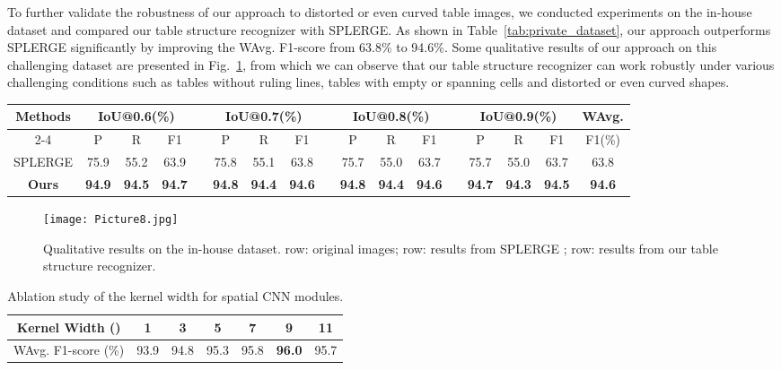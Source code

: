\documentclass[final,3p,times,twocolumn]{elsarticle}
\begin{document}
To further validate the robustness of our approach to distorted or even curved table images, we conducted experiments on the in-house dataset and compared our table structure recognizer with SPLERGE. As shown in Table~\ref{tab:private_dataset}, our approach outperforms SPLERGE significantly by improving the WAvg. F1-score from 63.8\% to 94.6\%. Some qualitative results of our approach on this challenging dataset are presented in Fig.~\ref{fig:TSR_curved_demo}, from which we can observe that our table structure recognizer can work robustly under various challenging conditions such as tables without ruling lines, tables with empty or spanning cells and distorted or even curved shapes. 
\begin{table*}[t]
    \setlength{\tabcolsep}{4.5pt}
    \footnotesize
    \centering
    \caption{TSR performance comparison on the in-house dataset.}
    \label{tab:private_dataset}
    \begin{tabular}{ c  c  c  c  c  c  c  c  c  c  c  c  c  c  c  c  c}
        \toprule
        \multirow{2}{*}{Methods} & \multicolumn{3}{c}{IoU@0.6(\%)} && \multicolumn{3}{c}{IoU@0.7(\%)} &&
        \multicolumn{3}{c}{IoU@0.8(\%)} &&
        \multicolumn{3}{c}{IoU@0.9(\%)} & WAvg. \\\cline{2-4}\cline{6-8}\cline{10-12}\cline{14-16}
         & P & R & F1 && P & R & F1 && P & R & F1 && P & R & F1 & F1(\%)\\
        \midrule
        SPLERGE \cite{tensmeyer2019deep} & 75.9 & 55.2 & 63.9 && 75.8 & 55.1 & 63.8 && 75.7 & 55.0 & 63.7 && 75.7 & 55.0 & 63.7 & 63.8 \\
        \textbf{Ours} & \textbf{94.9} & \textbf{94.5} & \textbf{94.7} && \textbf{94.8} & \textbf{94.4} & \textbf{94.6} && \textbf{94.8} & \textbf{94.4} & \textbf{94.6} && \textbf{94.7} & \textbf{94.3} & \textbf{94.5} & \textbf{94.6} \\
        \bottomrule
    \end{tabular}
\end{table*}
\begin{figure}[h!]
    \centering
    \setlength{\abovecaptionskip}{-0.3cm}
    \texttt{[image: Picture8.jpg]}
    \caption{Qualitative results on the in-house dataset.  row: original images;  row: results from SPLERGE \cite{tensmeyer2019deep};  row: results from our table structure recognizer.}
    \label{fig:TSR_curved_demo}
\end{figure}
\begin{table}[t]
    \setlength{\tabcolsep}{4.5pt}
    \centering
    \footnotesize
    \caption{Ablation study of the kernel width for spatial CNN modules.}
    \label{tab:kernel_size}
    \begin{tabular}{c c c c c c c}
        \hline
        Kernel Width () & 1 & 3 & 5 & 7 & 9 & 11  \\
        \hline
        WAvg. F1-score (\%) & 93.9 & 94.8 & 95.3 & 95.8 & \textbf{96.0} & 95.7 \\
        \hline
    \end{tabular}
\end{table}
\end{document}
